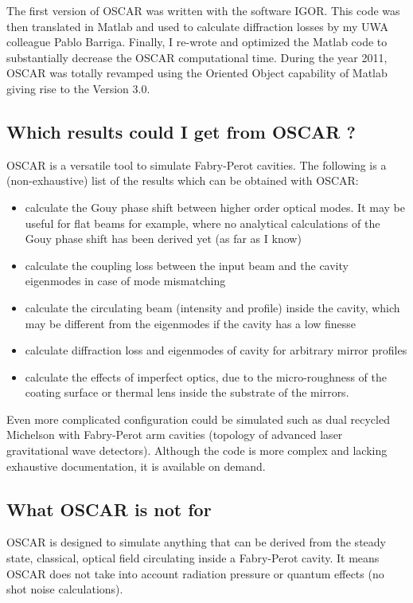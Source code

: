 The first version of OSCAR was written with the software IGOR. This code was then translated in Matlab and used to calculate diffraction losses by my UWA colleague Pablo Barriga. Finally, I re-wrote and optimized the Matlab code to substantially decrease the OSCAR computational time. During the year 2011, OSCAR was totally revamped using the Oriented Object capability of Matlab giving rise to the Version 3.0.

\subsection{Which results could I get from OSCAR ?}

OSCAR is a versatile tool to simulate Fabry-Perot cavities. The following is a (non-exhaustive) list of the results which can be obtained with OSCAR:
\begin{itemize}
  \item calculate the Gouy phase shift between higher order optical modes. It may be useful for flat beams for example, where no analytical calculations of the Gouy phase shift has been derived yet (as far as I know)
  \item calculate the coupling loss between the input beam and the cavity eigenmodes in case of mode mismatching
  \item calculate the circulating beam (intensity and profile) inside the cavity, which may be different from the eigenmodes if the cavity has a low finesse
  \item calculate diffraction loss and eigenmodes of cavity for arbitrary mirror profiles
  \item calculate the effects of imperfect optics, due to the micro-roughness of the coating surface or thermal lens inside the substrate of the mirrors.
\end{itemize}

Even more complicated configuration could be simulated such as dual recycled Michelson with Fabry-Perot arm cavities (topology of advanced laser gravitational wave detectors). Although the code is more complex and lacking exhaustive documentation, it is available on demand.

\subsection{What OSCAR is not for}

OSCAR is designed to simulate anything that can be derived from the steady state, classical, optical field circulating inside a Fabry-Perot cavity. It means OSCAR does not take into account radiation pressure or quantum effects (no shot noise calculations).

